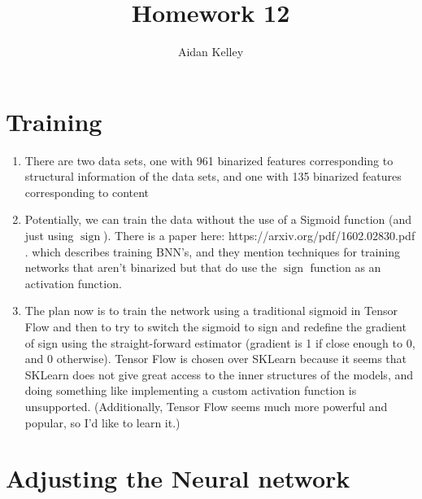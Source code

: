 \documentclass{article}
\title{Homework 12}
\author{Aidan Kelley}
\DeclareMathOperator{\sign}{sign}
\begin{document}
\section{Training}

\begin{enumerate}

\item There are two data sets, one with 961 binarized features corresponding to structural information of the data sets, and one with 135 binarized features corresponding to content

\item Potentially, we can train the data without the use of a Sigmoid function (and just using $\sign$). There is a paper here: https://arxiv.org/pdf/1602.02830.pdf . which describes training BNN's, and they mention techniques for training networks that aren't binarized but that do use the $\sign$ function as an activation function.

\item The plan now is to train the network using a traditional sigmoid in Tensor Flow and then to try to switch the sigmoid to sign and redefine the gradient of sign using the straight-forward estimator (gradient is 1 if close enough to 0, and 0 otherwise). Tensor Flow is chosen over SKLearn because it seems that SKLearn does not give great access to the inner structures of the models, and doing something like implementing a custom activation function is unsupported. (Additionally, Tensor Flow seems much more powerful and popular, so I'd like to learn it.)

\end{enumerate}

\section{Adjusting the Neural network}
\end{document}
